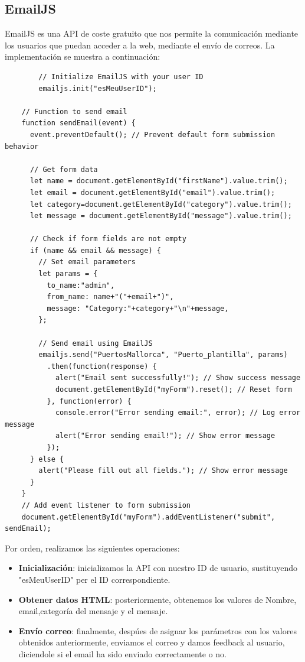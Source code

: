 \documentclass{article}
\begin{document}
\subsection{EmailJS}
    EmailJS es una API de coste gratuito que nos permite la comunicación mediante los usuarios que puedan acceder a la web, mediante el envío de correos. La implementación se muestra a continuación:

    \begin{verbatim}
        // Initialize EmailJS with your user ID
        emailjs.init("esMeuUserID");

    // Function to send email
    function sendEmail(event) {
      event.preventDefault(); // Prevent default form submission behavior
    
      // Get form data
      let name = document.getElementById("firstName").value.trim();
      let email = document.getElementById("email").value.trim();
      let category=document.getElementById("category").value.trim();
      let message = document.getElementById("message").value.trim();
    
      // Check if form fields are not empty
      if (name && email && message) {
        // Set email parameters
        let params = {
          to_name:"admin",
          from_name: name+"("+email+")",
          message: "Category:"+category+"\n"+message,
        };
    
        // Send email using EmailJS
        emailjs.send("PuertosMallorca", "Puerto_plantilla", params)
          .then(function(response) {
            alert("Email sent successfully!"); // Show success message
            document.getElementById("myForm").reset(); // Reset form
          }, function(error) {
            console.error("Error sending email:", error); // Log error message
            alert("Error sending email!"); // Show error message
          });
      } else {
        alert("Please fill out all fields."); // Show error message
      }
    }
    // Add event listener to form submission
    document.getElementById("myForm").addEventListener("submit", sendEmail);
    \end{verbatim}

    Por orden, realizamos las siguientes operaciones:

    \begin{itemize}
        \item \textbf{Inicialización}: inicializamos la API con nuestro ID de usuario, sustituyendo "esMeuUserID" per el ID correspondiente. 
        \item \textbf{Obtener datos HTML}: posteriormente, obtenemos los valores de Nombre, email,categoría del mensaje y el mensaje.
        \item \textbf{Envío correo}: finalmente, despúes de asignar los parámetros con los valores obtenidos anteriormente, enviamos el correo y damos feedback al usuario, diciendole si el email ha sido enviado correctamente o no.
    \end{itemize}
\end{document}
